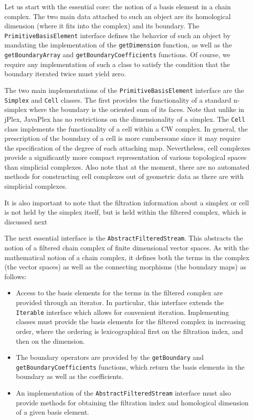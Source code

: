 Let us start with the essential core: the notion of a basis element in a chain complex. The two main data attached to such an object are its homological dimension (where it fits into the complex) and its boundary. The {\tt PrimitiveBasisElement} interface defines the behavior of such an object by mandating the implementation of the {\tt getDimension} function, as well as the {\tt getBoundaryArray} and {\tt getBoundaryCoefficients} functions. Of course, we require any implementation of such a class to satisfy the condition that the boundary iterated twice must yield zero.

The two main implementations of the {\tt PrimitiveBasisElement} interface are the {\tt Simplex} and {\tt Cell} classes. The first provides the functionality of a standard n-simplex where the boundary is the oriented sum of its faces. Note that unlike in jPlex, JavaPlex has no restrictions on the dimensionality of a simplex. The {\tt Cell} class implements the functionality of a cell within a CW complex. In general, the prescription of the boundary of a cell is more cumbersome since it may require the specification of the degree of each attaching map. Nevertheless, cell complexes provide a significantly more compact representation of various topological spaces than simplicial complexes. Also note that at the moment, there are no automated methods for constructing cell complexes out of geometric data as there are with simplicial complexes.

It is also important to note that the filtration information about a simplex or cell is not held by the simplex itself, but is held within the filtered complex, which is discussed next

The next essential interface is the {\tt AbstractFilteredStream}. This abstracts the notion of a filtered chain complex of finite dimensional vector spaces. As with the mathematical notion of a chain complex, it defines both the terms in the complex (the vector spaces) as well as the connecting morphisms (the boundary maps) as follows:

\begin{itemize}
\item Access to the basis elements for the terms in the filtered complex are provided through an iterator. In particular, this interface extends the {\tt Iterable} interface which allows for convenient iteration. Implementing classes must provide the basis elements for the filtered complex in increasing order, where the ordering is lexicographical first on the filtration index, and then on the dimension.
\item The boundary operators are provided by the {\tt getBoundary} and {\tt getBoundaryCoefficients} functions, which return the basis elements in the boundary as well as the coefficients.
\item An implementation of the {\tt AbstractFilteredStream} interface must also provide methods for obtaining the filtration index and homological dimension of a given basis element.
\end{itemize}

